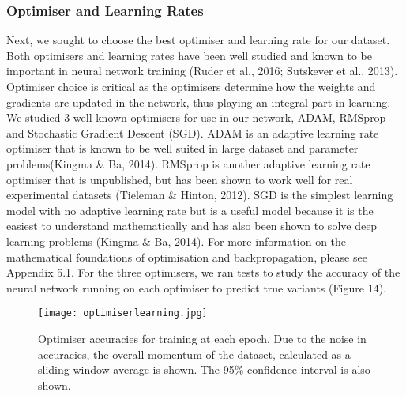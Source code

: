 \documentclass{article}
\begin{document}
\subsubsection{Optimiser and Learning Rates}
Next, we sought to choose the best optimiser and learning rate for our dataset. Both optimisers and learning rates have been well studied and known to be important in neural network training (Ruder et al., 2016; Sutskever et al., 2013). Optimiser choice is critical as the optimisers determine how the weights and gradients are updated in the network, thus playing an integral part in learning. We studied 3 well-known optimisers for use in our network, ADAM, RMSprop and Stochastic Gradient Descent (SGD). ADAM is an adaptive learning rate optimiser that is known to be well suited in large dataset and parameter problems(Kingma \& Ba, 2014). RMSprop is another adaptive learning rate optimiser that is unpublished, but has been shown to work well for real experimental datasets (Tieleman \& Hinton, 2012). SGD is the simplest learning model with no adaptive learning rate but is a useful model because it is the easiest to understand mathematically and has also been shown to solve deep learning problems (Kingma \& Ba, 2014). For more information on the mathematical foundations of optimisation and backpropagation, please see Appendix 5.1. For the three optimisers, we ran tests to study the accuracy of the neural network running on each optimiser to predict true variants (Figure 14).
\begin{figure}[H]
\texttt{[image: optimiserlearning.jpg]}
\centering
\caption{Optimiser accuracies for training at each epoch. Due to the noise in accuracies, the overall momentum of the dataset, calculated as a sliding window average is shown. The 95\% confidence interval is also shown.}
\end{figure}
\end{document}
